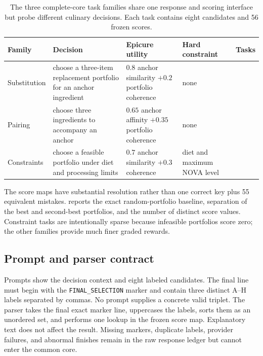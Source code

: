 \documentclass[10pt,twocolumn]{article}
\begin{document}
\begin{table}[t]
  \centering
  \footnotesize
  \setlength{\tabcolsep}{4pt}
  \begin{tabularx}{\linewidth}{@{}l X X X r@{}}
    \toprule
    Family & Decision & Epicure utility & Hard constraint & Tasks \\
    \midrule
    Substitution & choose a three-item replacement portfolio for an anchor ingredient &
      $0.8$ anchor similarity $+0.2$ portfolio coherence & none & \FBTasksPerFamily{} \\
    Pairing & choose three ingredients to accompany an anchor &
      $0.65$ anchor affinity $+0.35$ portfolio coherence & none & \FBTasksPerFamily{} \\
    Constraints & choose a feasible portfolio under diet and processing limits &
      $0.7$ anchor similarity $+0.3$ coherence & diet and maximum NOVA level & \FBTasksPerFamily{} \\
    \bottomrule
  \end{tabularx}
  \caption{The three complete-core task families share one response and scoring interface but
  probe different culinary decisions. Each task contains eight candidates and 56 frozen scores.}
  \label{tab:task-families}
\end{table}

The score maps have substantial resolution rather than one correct key plus 55 equivalent
mistakes.  reports the exact random-portfolio baseline, separation of
the best and second-best portfolios, and the number of distinct score values. Constraint tasks are
intentionally sparse because infeasible portfolios score zero; the other families provide much
finer graded rewards.

\begin{table}[t]
  \centering
  \scriptsize
  \setlength{\tabcolsep}{3pt}
  
  \caption{Frozen task-map diagnostics for \FBTasksPerFamily{} scheduled tasks per family,
  computed before model execution.
  Chance is the uniformly random portfolio mean; top gap is the median best--second-best margin.}
  \label{tab:task-diagnostics}
\end{table}

\subsection{Prompt and parser contract}

Prompts show the decision context and eight labeled candidates. The final line must begin with the
\texttt{FINAL\_SELECTION} marker and contain three distinct A--H labels separated by commas. No
prompt supplies a concrete valid triplet. The parser takes the final exact marker line, uppercases
the labels, sorts them as an unordered set, and performs one lookup in the frozen score map.
Explanatory text does not affect the result. Missing markers, duplicate labels, provider failures,
and abnormal finishes remain in the raw response ledger but cannot enter the common core.
\end{document}
